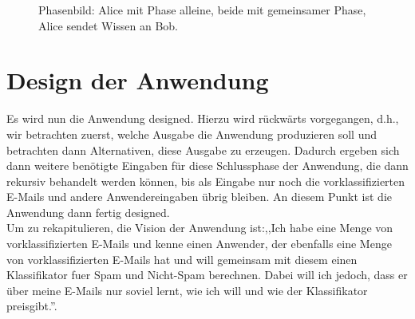 \documentclass{article}
\theoremstyle{definition}
\theoremstyle{remark}
\begin{document}
\begin{figure}
\caption{Phasenbild: Alice mit Phase alleine, beide mit gemeinsamer Phase, Alice sendet Wissen an Bob.}
\label{fig:phaseExample}
\end{figure}
\section{Design der Anwendung}
Es wird nun die Anwendung designed. Hierzu wird r\"uckw\"arts vorgegangen, d.h.,
wir betrachten zuerst, welche Ausgabe die Anwendung produzieren soll und 
betrachten dann Alternativen, diese Ausgabe zu erzeugen. Dadurch ergeben sich
dann weitere ben\"otigte Eingaben f\"ur diese Schlussphase der Anwendung, die
dann rekursiv behandelt werden k\"onnen, bis als Eingabe nur noch die 
vorklassifizierten E-Mails und andere Anwendereingaben \"ubrig bleiben.
An diesem Punkt ist die Anwendung dann fertig designed.\\
Um zu rekapitulieren, die Vision der Anwendung ist:,,Ich habe eine Menge von
vorklassifizierten E-Mails und kenne einen Anwender, der ebenfalls eine Menge
von vorklassifizierten E-Mails hat und will gemeinsam mit diesem einen 
Klassifikator fuer Spam und Nicht-Spam berechnen. Dabei will ich jedoch, dass
er \"uber meine E-Mails nur soviel lernt, wie ich will und wie der Klassifikator
preisgibt.''.
\end{document}
